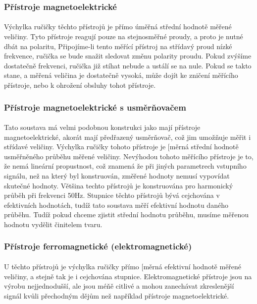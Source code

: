 \documentclass{praktikum}
\begin{document}
\subsubsection{Přístroje magnetoelektrické}
\paragraph{}
Výchylka ručičky těchto přístrojů je přímo úměřná střední hodnotě měřené veličiny. Tyto přístroje reagují pouze na stejnosměřné proudy, a proto je nutné dbát na polaritu, Připojíme-li tento měřící přístroj na střídavý proud nízké frekvence, ručička se bude snažit sledovat změnu polarity proudu. Pokud zvýšíme dostatečně frekvenci, ručička již stíhat nebude a ustálí se na nule. Pokud se takto stane, a měřená veličina je dostatečně vysoká, může dojít ke zničení měřícího přístroje, nebo k ohrožení obsluhy tohot přístroje.

\subsubsection{Přístroje magnetoelektrické s usměrňovačem}
\paragraph{}
Tato soustava má velmi podobnou konstrukci jako mají přístroje magnetoelektrické, akorát mají předřazený usměrňovač, což jim umožňuje měřit i střídavé veličiny. Výchylka ručičky tohoto přístroje je [měrná střední hodnotě usměřněného průběhu měřené veličiny. Nevýhodou tohoto měřícího přístroje je to, že nemá lineární propustnost, což znamená že při jiných parametrech vstupního signálu, než na který byl konstruován, změřené hodnoty nemusí vypovídat skutečné hodnoty. Většina techto přístrojů je konstruována pro harmonický průběh při frekvenci 50Hz. Stupnice těchto přístrojů bývá cejchována v efektivních hodnotách, tudíž tato soustava měří efektivní hodnotu daného průběhu. Tudíž pokud chceme zjistit střední hodnotu průběhu, musíme měřenou hodnotu vydělit činitelem tvaru.

\subsubsection{Přístroje ferromagnetické (elektromagnetické)}
\paragraph{}
U těchto přístrojů je výchylka ručičky přímo [měrná efektivní hodnotě měřené veličiny, a stejně tak je i cejchována stupnice. Elektromagnetické přístroje jsou na výrobu nejjednodušší, ale jsou méňě citlivé a mohou zanechávat zkreslenější signál kvůli přechodným dějům než například přístroje magnetoelektrické.
\end{document}
